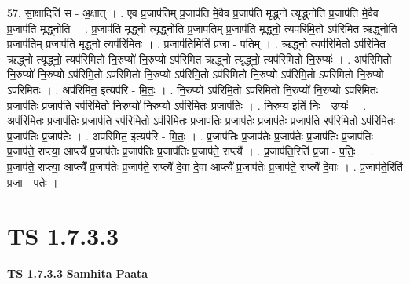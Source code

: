\documentclass[17pt]{extarticle}
\begin{document}
57. सा॒क्षादिति॑ स - अ॒क्षात् । . ए॒व प्र॒जाप॑तिम् प्र॒जाप॑ति मे॒वैव प्र॒जाप॑ति मृद्ध्नो त्यृद्ध्नोति प्र॒जाप॑ति मे॒वैव प्र॒जाप॑ति मृद्ध्नोति । . प्र॒जाप॑ति मृद्ध्नो त्यृद्ध्नोति प्र॒जाप॑तिम् प्र॒जाप॑ति मृद्ध्नो॒ त्यप॑रिमि॒तो ऽप॑रिमित ऋद्ध्नोति प्र॒जाप॑तिम् प्र॒जाप॑ति मृद्ध्नो॒ त्यप॑रिमितः । . प्र॒जाप॑ति॒मिति॑ प्र॒जा - प॒ति॒म् । . ऋ॒द्ध्नो॒ त्यप॑रिमि॒तो ऽप॑रिमित ऋद्ध्नो त्यृद्ध्नो॒ त्यप॑रिमितो नि॒रुप्यो॑ नि॒रुप्यो ऽप॑रिमित ऋद्ध्नो त्यृद्ध्नो॒ त्यप॑रिमितो नि॒रुप्यः॑ । . अप॑रिमितो नि॒रुप्यो॑ नि॒रुप्यो ऽप॑रिमि॒तो ऽप॑रिमितो नि॒रुप्यो ऽप॑रिमि॒तो ऽप॑रिमितो नि॒रुप्यो ऽप॑रिमि॒तो ऽप॑रिमितो नि॒रुप्यो ऽप॑रिमितः । . अप॑रिमित॒ इत्यप॑रि - मि॒तः॒ । . नि॒रुप्यो ऽप॑रिमि॒तो ऽप॑रिमितो नि॒रुप्यो॑ नि॒रुप्यो ऽप॑रिमितः प्र॒जाप॑तिः प्र॒जाप॑ति॒ रप॑रिमितो नि॒रुप्यो॑ नि॒रुप्यो ऽप॑रिमितः प्र॒जाप॑तिः । . नि॒रुप्य॒ इति॑ निः - उप्यः॑ । . अप॑रिमितः प्र॒जाप॑तिः प्र॒जाप॑ति॒ रप॑रिमि॒तो ऽप॑रिमितः प्र॒जाप॑तिः प्र॒जाप॑तेः प्र॒जाप॑तेः प्र॒जाप॑ति॒ रप॑रिमि॒तो ऽप॑रिमितः प्र॒जाप॑तिः प्र॒जाप॑तेः । . अप॑रिमित॒ इत्यप॑रि - मि॒तः॒ । . प्र॒जाप॑तिः प्र॒जाप॑तेः प्र॒जाप॑तेः प्र॒जाप॑तिः प्र॒जाप॑तिः प्र॒जाप॑ते॒ राप्त्या॒ आप्त्यै᳚ प्र॒जाप॑तेः प्र॒जाप॑तिः प्र॒जाप॑तिः प्र॒जाप॑ते॒ राप्त्यै᳚ । . प्र॒जाप॑ति॒रिति॑ प्र॒जा - प॒तिः॒ । . प्र॒जाप॑ते॒ राप्त्या॒ आप्त्यै᳚ प्र॒जाप॑तेः प्र॒जाप॑ते॒ राप्त्यै॑ दे॒वा दे॒वा आप्त्यै᳚ प्र॒जाप॑तेः प्र॒जाप॑ते॒ राप्त्यै॑ दे॒वाः । . प्र॒जाप॑ते॒रिति॑ प्र॒जा - प॒तेः॒ । \newline
\pagebreak
{}

\section{ TS 1.7.3.3 }

\textbf{TS 1.7.3.3 } \newline
\textbf{Samhita Paata} \newline
\end{document}
